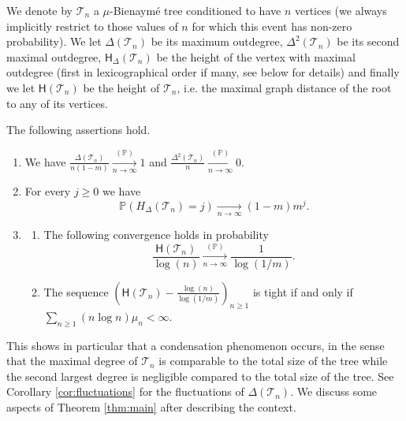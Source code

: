 \documentclass[a4paper,11pt]{article}
\DeclareRobustCommand{\P}{\mathbb{P}}
\DeclareRobustCommand{\to}{\xrightarrow[n\rightarrow \infty]{}}
\DeclareRobustCommand{\prob}{\xrightarrow[n \rightarrow \infty]{(\P)}}
\DeclareRobustCommand{\T}{\mathcal{T}}
\begin{document}
       
              
       
        
        We denote by $\T_{n}$ a $\mu$-Bienaymé tree conditioned to have $n$ vertices  (we always implicitly restrict to those values of $n$ for which this event has non-zero probability). We let $\Delta(\mathcal{T}_n)$ be its maximum outdegree,  $\Delta^{2}(\mathcal{T}_n)$ be its second maximal outdegree, $\mathsf{H}_\Delta(\mathcal{T}_n)$ be the height of the vertex with maximal outdegree (first in lexicographical order if many, see below for details) and finally we let $\mathsf{H}(\T_{n})$ be the height of $\T_{n}$, i.e. the maximal graph distance of the root to any of its vertices.
        
              \begin{theorem}\label{thm:main}
              The following assertions hold.
              \begin{enumerate}
              \item[(i)] [condensation] We have
              $\displaystyle \frac{\Delta(\mathcal{T}_n)}{n(1-m)}\prob 1$ and $\displaystyle\frac{\Delta^{2}(\mathcal{T}_n)}{n}\prob 0.$
              \item[(ii)] [height of condensation vertex] For every $j \geq 0$ we have
              $$\P(H_{\Delta}(\mathcal{T}_n)=j) \to (1-m)m^{j}.$$
              \item[(iii)] [height of the tree] 
              \begin{enumerate}
              \item[(a)]               The following convergence holds in probability
                                 $$ \frac{\mathsf{H}(\mathcal{T}_n)}{\log(n)} \prob \frac{1}{\log(1/m)}.$$
              \item[(b)] The sequence $ \left({\mathsf{H}(\mathcal{T}_n)}- \frac{\log(n)}{\log(1/m)} \right)_{n \geq 1}$ is tight if and only if $\sum_{n \geq 1} ( n \log n) \mu_{n} <\infty$.
              \end{enumerate}
              \end{enumerate}
              \end{theorem} 
              This shows in particular that a condensation phenomenon occurs, in the sense that the maximal degree of $\T_{n}$ is comparable to the total size of the tree while the second largest degree is negligible compared to the total size of the tree. See Corollary \ref{cor:fluctuations} for the fluctuations of $\Delta(\mathcal{T}_n)$. We discuss some aspects of Theorem \ref{thm:main} after describing the context.
        
\end{document}
